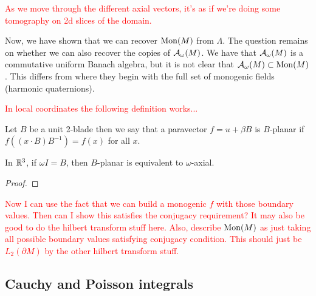 \documentclass[12pt]{article}
\begin{document}


\textcolor{red}{As we move through the different axial vectors, it's as if we're doing some tomography on 2d slices of the domain.}


Now, we have shown that we can recover $\operatorname{Mon}(M)$ from $\Lambda$.  The question remains on whether we can also recover the copies of $\mathcal{A}_{\omega}(M)$. We have that $\mathcal{A}_{\omega}(M)$ is a commutative uniform Banach algebra, but it is not clear that $\mathcal{A}_{\omega}(M)\subset \operatorname{Mon}(M)$.  This differs from \cite{belishev_algebras_2019} where they begin with the full set of monogenic fields (harmonic quaternions). 


\textcolor{red}{In local coordinates the following definition works...}

\begin{definition}
    Let $B$ be a unit 2-blade then we say that a paravector $f=u+\beta B$ is $B$-planar if $f((x\cdot B)B^{-1})=f(x)$ for all $x$.
\end{definition} 

\begin{theorem}
    In $\mathbb{R}^3$, if $\omega I = B$, then $B$-planar is equivalent to $\omega$-axial.
\end{theorem}
\begin{proof}
\end{proof}

\textcolor{red}{Now I can use the fact that we can build a monogenic $f$ with those boundary values.  Then can I show this satisfies the conjugacy requirement? It may also be good to do the hilbert transform stuff here. Also, describe $\operatorname{Mon}(M)$ as just taking all possible boundary values satisfying conjugacy condition.  This should just be $L_2(\partial M)$ by the other hilbert transform stuff.}

\subsection{Cauchy and Poisson integrals}
\end{document}
